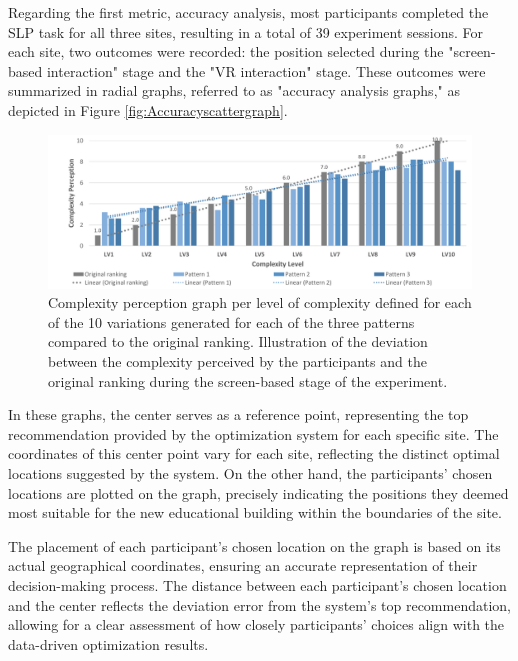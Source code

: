 Regarding the first metric, accuracy analysis, most participants completed the SLP task for all three sites, resulting in a total of 39 experiment sessions. For each site, two outcomes were recorded: the position selected during the "screen-based interaction" stage and the "VR interaction" stage. These outcomes were summarized in radial graphs, referred to as "accuracy analysis graphs," as depicted in Figure \ref{fig:Accuracyscattergraph}.

        \begin{figure}[htb]
          \centering
          \includegraphics[width= \linewidth, trim=0 0 0 0]{Images/ComplexityPerceptionPerLevel}
          \caption{Complexity perception graph per level of complexity defined for each of the 10 variations generated for each of the three patterns compared to the original ranking. Illustration of the deviation between the complexity perceived by the participants and the original ranking during the screen-based stage of the experiment.}
          \label{fig:ComplexityPerceptionPerLevel}
        \end{figure}

In these graphs, the center serves as a reference point, representing the top recommendation provided by the optimization system for each specific site. The coordinates of this center point vary for each site, reflecting the distinct optimal locations suggested by the system. On the other hand, the participants' chosen locations are plotted on the graph, precisely indicating the positions they deemed most suitable for the new educational building within the boundaries of the site.

The placement of each participant's chosen location on the graph is based on its actual geographical coordinates, ensuring an accurate representation of their decision-making process. The distance between each participant's chosen location and the center reflects the deviation error from the system's top recommendation, allowing for a clear assessment of how closely participants' choices align with the data-driven optimization results.

